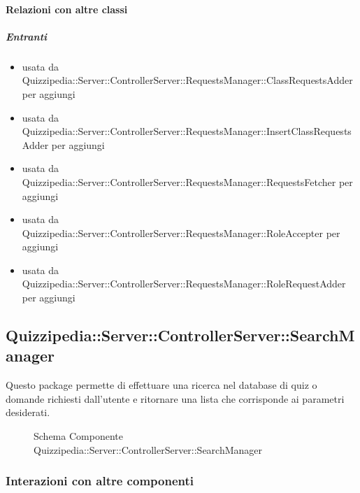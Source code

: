 \paragraph{Relazioni con altre classi}
\subparagraph{Entranti}
\begin{itemize}
\item usata da Quizzipedia::Server::ControllerServer::RequestsManager::ClassRequestsAdder per aggiungi
\item usata da Quizzipedia::Server::ControllerServer::RequestsManager::InsertClassRequestsAdder per aggiungi
\item usata da Quizzipedia::Server::ControllerServer::RequestsManager::RequestsFetcher per aggiungi
\item usata da Quizzipedia::Server::ControllerServer::RequestsManager::RoleAccepter per aggiungi
\item usata da Quizzipedia::Server::ControllerServer::RequestsManager::RoleRequestAdder per aggiungi
\end{itemize}
\subsection{Quizzipedia::Server::ControllerServer::SearchManager}
Questo package permette di effettuare una ricerca nel database di quiz o domande richiesti dall'utente e ritornare una lista che corrisponde ai parametri desiderati.
\begin{figure}[H]
\centering
\noindent{}
\caption[Schema Componente Quizzipedia::Server::ControllerServer::SearchManager]{Schema Componente Quizzipedia::Server::ControllerServer::SearchManager}
\end{figure}
\subsubsection{Interazioni con altre componenti}
